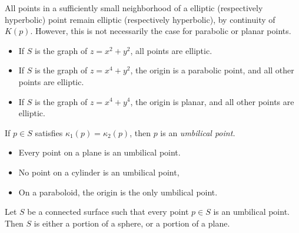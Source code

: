 \begin{rmk}
    All points in a sufficiently small neighborhood of a elliptic (respectively hyperbolic) point remain elliptic (respectively hyperbolic), by continuity of $K(p)$. However, this is not necessarily the case for parabolic or planar points.
\end{rmk}

\begin{exmp}\proofbreak
    \begin{itemize}
        \item If $S$ is the graph of $z = x^2 + y^2$, all points are elliptic.
        \item If $S$ is the graph of $z = x^4 + y^2$, the origin is a parabolic point, and all other points are elliptic.
        \item If $S$ is the graph of $z = x^4 + y^4$, the origin is planar, and all other points are elliptic. 
    \end{itemize}
\end{exmp}

\begin{defn}
    If $p \in S$ satisfies $\kappa_1(p) = \kappa_2(p)$, then $p$ is an \emph{umbilical point.}
\end{defn}

\begin{exmp}\proofbreak
    \begin{itemize}
        \item Every point on a plane is an umbilical point.
        \item No point on a cylinder is an umbilical point,
        \item On a paraboloid, the origin is the only umbilical point.
    \end{itemize}
\end{exmp}

\begin{prop}
    Let $S$ be a connected surface such that every point $p \in S$ is an umbilical point. Then $S$ is either a portion of a sphere, or a portion of a plane.
\end{prop}

